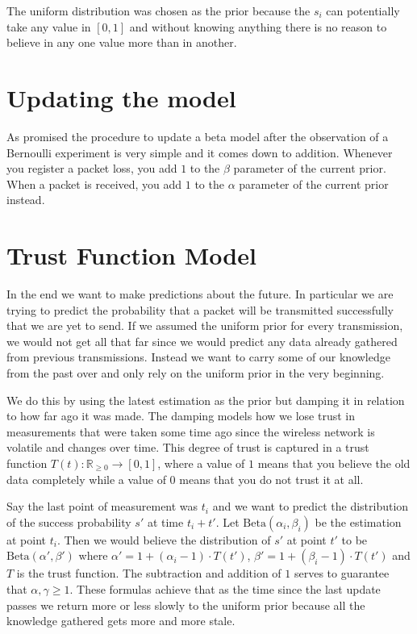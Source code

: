 \documentclass[10pt,a4paper]{article}
\begin{document}
The uniform distribution was chosen as the prior because the $s_{i}$ can potentially take any value in $[0, 1]$ and without knowing anything there is no reason to believe in any one value more than in another.

\section{Updating the model}

As promised the procedure to update a beta model after the observation of a Bernoulli experiment is very simple and it comes down to addition.
Whenever you register a packet loss, you add $1$ to the $\beta$ parameter of the current prior.
When a packet is received, you add $1$ to the $\alpha$ parameter of the current prior instead.

\section{Trust Function Model}
\label{sec:trust_function}

In the end we want to make predictions about the future.
In particular we are trying to predict the probability that a packet will be transmitted successfully that we are yet to send.
If we assumed the uniform prior for every transmission, we would not get all that far since we would predict any data already gathered from previous transmissions.
Instead we want to carry some of our knowledge from the past over and only rely on the uniform prior in the very beginning.

We do this by using the latest estimation as the prior but damping it in relation to how far ago it was made.
The damping models how we lose trust in measurements that were taken some time ago since the wireless network is volatile and changes over time.
This degree of trust is captured in a trust function $T(t) : \mathbb{R}_{\ge 0} \rightarrow [0, 1]$, where a value of $1$ means that you believe the old data completely while a value of $0$ means that you do not trust it at all.

Say the last point of measurement was $t_{i}$ and we want to predict the distribution of the success probability $s'$ at time $t_{i} + t'$.
Let $\mathrm{Beta}(\alpha_{i}, \beta_{i})$ be the estimation at point $t_{i}$.
Then we would believe the distribution of $s'$ at point $t'$ to be $\mathrm{Beta}(\alpha', \beta')$ where $\alpha' = 1 + (\alpha_{i} - 1) \cdot T(t')$, $\beta' = 1 + (\beta_{i} - 1) \cdot T(t')$ and $T$ is the trust function.
The subtraction and addition of $1$ serves to guarantee that $\alpha, \gamma \ge 1$.
These formulas achieve that as the time since the last update passes we return more or less slowly to the uniform prior because all the knowledge gathered gets more and more stale.
\end{document}
